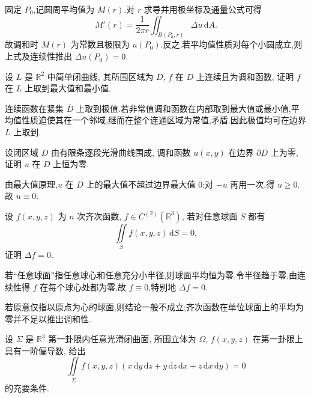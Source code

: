 \begin{solution}
    固定 $P_0$,记圆周平均值为 $M(r)$.对 $r$ 求导并用极坐标及通量公式可得
    \[
        M'(r)=\dfrac{1}{2\pi r}\iint_{B(P_0,r)}\Delta u\,\mathrm{d}A.
    \]
    故调和时 $M(r)$ 为常数且极限为 $u(P_0)$.反之,若平均值性质对每个小圆成立,则上式及连续性推出 $\Delta u(P_0)=0$.
\end{solution}

\begin{example}
    设 $L$ 是 $\mathbb{R}^2$ 中简单闭曲线, 其所围区域为 $D$, $f$ 在 $D$ 上连续且为调和函数, 证明 $f$ 在 $L$ 上取到最大值和最小值.
\end{example}
\exampleblank

\begin{solution}
    连续函数在紧集 $\overline D$ 上取到极值.若非常值调和函数在内部取到最大值或最小值,平均值性质迫使其在一个邻域,继而在整个连通区域为常值,矛盾.因此极值均可在边界 $L$ 上取到.
\end{solution}

\begin{example}
    设闭区域 $D$ 由有限条逐段光滑曲线围成, 调和函数 $u(x,y)$ 在边界 $\partial D$ 上为零, 证明 $u$ 在 $D$ 上恒为零.
\end{example}
\exampleblank

\begin{solution}
    由最大值原理,$u$ 在 $D$ 上的最大值不超过边界最大值 $0$;对 $-u$ 再用一次,得 $u\geq0$.故 $u\equiv0$.
\end{solution}

\begin{example}
    设 $f(x,y,z)$ 为 $n$ 次齐次函数, $f\in C^{(2)}(\mathbb{R}^3)$, 若对任意球面 $S$ 都有
    \[
        \displaystyle\iint\limits_Sf(x,y,z)\,\mathrm{d}S=0,
    \]
    证明 $\Delta f=0$.
\end{example}
\exampleblank

\begin{solution}
    若``任意球面''指任意球心和任意充分小半径,则球面平均恒为零.令半径趋于零,由连续性得 $f$ 在每个球心处都为零,故 $f\equiv0$,特别地 $\Delta f=0$.

    若原意仅指以原点为心的球面,则结论一般不成立;齐次函数在单位球面上的平均为零并不足以推出调和性.
\end{solution}

\begin{example}
    设 $\Sigma$ 是 $\mathbb{R}^3$ 第一卦限内任意光滑闭曲面, 所围立体为 $\Omega$, $f(x,y,z)$ 在第一卦限上具有一阶偏导数, 给出
    \[
        \displaystyle\iint\limits_\Sigma f(x,y,z)(x\,\mathrm{d}y\,\mathrm{d}z+y\,\mathrm{d}z\,\mathrm{d}x+z\,\mathrm{d}x\,\mathrm{d}y)=0
    \]
    的充要条件.
\end{example}
\exampleblank

